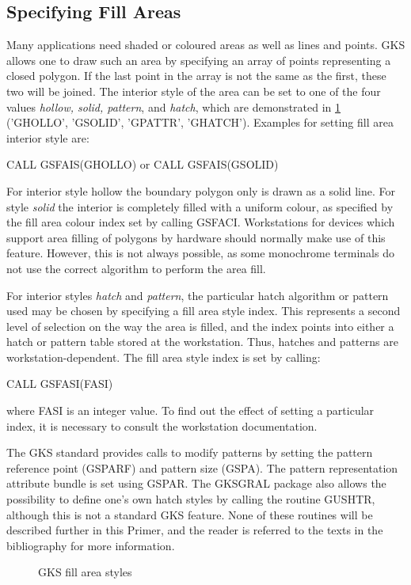 \subsection{Specifying Fill Areas}
 
Many applications need shaded or coloured areas as well as lines and points.
GKS allows one to draw such an area by specifying an array of points
representing a closed polygon. If the last point in the array is not the
same as the first, these two will be joined.
The interior style of the area can be set to one of the four values
{\it hollow, solid, pattern}, and {\it hatch},
which are demonstrated in \ref{fig:fill}
('GHOLLO', 'GSOLID', 'GPATTR', 'GHATCH').
Examples for setting fill area interior style are:
\begin{XMP}
CALL GSFAIS(GHOLLO)
     or
CALL GSFAIS(GSOLID)
\end{XMP}
 
For interior style hollow the boundary polygon only is drawn as a solid line.
For style {\it solid} the interior is completely filled with a uniform
colour, as specified by the fill area colour index set by calling GSFACI.
Workstations for devices which support area filling of polygons by hardware
should normally make use of this feature.
However, this is not always possible, as some monochrome terminals do not
use the correct algorithm to perform the area fill.
 
For interior styles {\it hatch} and {\it pattern},
the particular hatch algorithm or pattern used may be chosen by specifying
a fill area style index.
This represents a second level of selection on the way the area is filled,
and the index points into either a hatch or pattern table stored at the
workstation. Thus, hatches and patterns are workstation-dependent.
The fill area style index is set by calling:
\begin{XMP}
CALL GSFASI(FASI)
\end{XMP}
where FASI is an integer value. To find out the effect of setting a particular
index, it is necessary to consult the workstation documentation.
 
The GKS standard provides calls to modify patterns by setting the pattern
reference point (GSPARF) and pattern size (GSPA).
The pattern representation attribute bundle is set using GSPAR.
The GKSGRAL package also allows the possibility to define one's
own hatch styles by calling the routine GUSHTR,
although this is not a standard GKS feature.
None of these routines will be described further in this Primer,
and the reader is referred to the texts in the bibliography
for more information.
\begin{figure}[h]
\caption{GKS fill area styles}
\label{fig:fill}
\end{figure}
